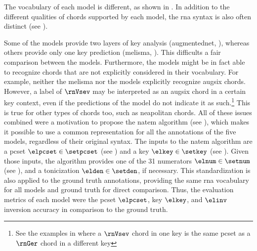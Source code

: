 
The vocabulary of each model is different, as shown in
. In addition to the different
qualities of chords supported by each model, the \gls{rna}
syntax is also often distinct (see
). 


Some of the models provide two layers of key analysis
(\gls{augmentednet}, \cite{micchi2021deep, chen2021attend}),
whereas others provide only one key prediction
(\gls{melisma}, \cite{mcleod2021modular}). This difficults a
fair comparison between the models. Furthermore, the models
might be in fact able to recognize chords that are not
explicitly considered in their vocabulary. For example,
neither the \gls{melisma} nor the
\textcite{mcleod2021modular} models explicitly recognize
\gls{augsix} chords. However, a label of $\rnVsev$ may be
interpreted as an \gls{augsix} chord in a certain key
context, even if the predictions of the model do not
indicate it as such.\footnote{See the examples in
 where a
$\rnVsev$ chord in one key is the same \gls{pcset} as a
$\rnGer$ chord in a different key} This is true for other
types of chords too, such as \gls{neapolitan} chords. All of
these issues combined were a motivation to propose the
\gls{natem} algorithm (see
), which
makes it possible to use a common representation for all the
annotations of the five models, regardless of their original
syntax. The inputs to the \gls{natem} algorithm are a
\gls{pcset} $\elpcset \in \setpcset$ (see
) and a key $\elkey
\in \setkey$ (see ).
Given those inputs, the algorithm provides one of the 31
numerators $\elnum \in \setnum$ (see
), and a
tonicization $\elden \in \setden$, if necessary. This
standardization is also applied to the ground truth
annotations, providing the same \gls{rna} vocabulary for all
models and ground truth for direct comparison. Thus, the
evaluation metrics of each model were the \gls{pcset}
$\elpcset$, key $\elkey$, and $\elinv$ inversion accuracy in
comparison to the ground truth.

